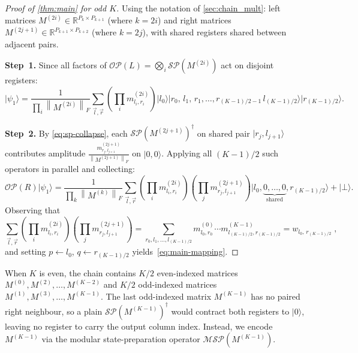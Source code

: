 \documentclass[a4paper,UKenglish,cleveref,autoref,thm-restate]{socg-lipics-v2021}
\providecommand{\ket}[1]{\lvert #1 \rangle}
\newcommand{\norm}[1]{\left\| #1 \right\|}
\newcommand{\SP}{\mathcal{SP}}        %
\newcommand{\MSP}{\mathcal{MSP}} %
\newcommand{\OP}{\mathcal{OP}}        %
\begin{document}
\begin{proof}[Proof of \cref{thm:main} for odd $K$]\label{subsec:proof-odd}
Using the notation of \cref{sec:chain_mult}: left matrices
$M^{(2i)} \in \mathbb{R}^{P_k \times P_{k+1}}$ (where $k = 2i$) and right matrices
$M^{(2j+1)} \in \mathbb{R}^{ P_{k+1} \times  P_{k+2}}$  (where $k = 2j$), with shared registers shared between adjacent pairs. 

\smallskip\noindent\textbf{Step~1.}
Since all factors of $\OP(L) = \bigotimes_i \SP(M^{(2i)})$ act on
disjoint registers:
\begin{equation*}\label{eq:psi1-gen}
  \ket{\psi_1} = \frac{1}{\prod_i \norm{M^{(2i)}}_F}
    \!\!\sum_{\vec{l},\vec{r}}
    \!\!\left(\prod_i m^{(2i)}_{l_i,r_i}\right)
    \ket{l_0}\ket{r_0,\,l_1,\, r_1,\ldots,r_{(K-1)/2-1}\,l_{(K-1)/2}}\ket{r_{(K-1)/2}}.
\end{equation*}

\smallskip\noindent\textbf{Step~2.}
By \cref{eq:sp-collapse}, each $\SP(M^{(2j+1)})^\dagger$ on shared pair
$\ket{r_j, l_{j+1}}$ contributes amplitude
$\frac{m^{(2j+1)}_{r_j,l_{j+1}}}{\norm{M^{(2j+1)}}_F}$ on $\ket{0,0}$.
Applying all $(K-1)/2$ such operators in parallel and collecting:
\begin{equation*}\label{eq:OPR-psi1-gen}
  \OP(R)\ket{\psi_1}
  = \frac{1}{\prod_{k} \norm{M^{(k)}}_F}
    \sum_{\vec{l},\vec{r}}
    \!\!\left(\prod_i m^{(2i)}_{l_i,r_i}\right)
    \!\!\left(\prod_j m^{(2j+1)}_{r_j,l_{j+1}}\right)
    \ket{l_0,\underbrace{0,\ldots,0}_{\text{shared}},r_{(K-1)/2}}
    + \ket{\bot}.
\end{equation*}
\noindent Observing that 
$$
   \sum_{\vec{l},\vec{r}}
    \!\!\left(\prod_{i} m^{(2i)}_{l_i,r_i}\right)
    \!\!\left(\prod_j m^{(2j+1)}_{r_j,l_{j+1}}\right)=  \!\!\sum_{r_0,l_1,\ldots,l_{(K-1)/2}}
  \!\!m^{(0)}_{l_0,r_0}\cdots m^{(K-1)}_{l_{(K-1)/2},r_{(K-1)/2}}
  = w_{l_0,\,r_{(K-1)/2}}\;,
$$
and setting
$p \leftarrow l_0$, $q \leftarrow r_{(K-1)/2}$
yields~\cref{eq:main-mapping}.
\end{proof}


When $K$ is even, the chain contains $K/2$ even-indexed matrices ${M^{(0)}, M^{(2)}, \ldots, M^{(K-2)}}$ and $K/2$ odd-indexed matrices ${M^{(1)}, M^{(3)}, \ldots, M^{(K-1)}}$. The last odd-indexed matrix $M^{(K-1)}$ has no paired right neighbour, so a plain $\SP(M^{(K-1)})^{\dagger}$ would contract both registers to $\ket{0}$, leaving no register to carry the output column index. Instead, we encode $M^{(K-1)}$ via the modular state-preparation operator $\MSP(M^{(K-1)})$.
\end{document}

